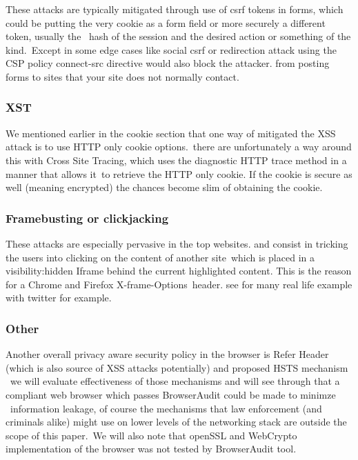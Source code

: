 \documentclass[a4paper,12pt]{paper}
\begin{document}
These attacks are typically mitigated through use of csrf tokens in forms, which could be putting the very cookie as a form field or more securely a different token, usually the \
hash of the session and the desired action or something of the kind.\ Except in some edge cases like social csrf or redirection attack using the CSP policy connect-src directive would also block the attacker.
from posting forms to sites that your site does not normally contact.\\

\subsubsection{XST}
\label{label:xst}

We mentioned earlier in the cookie section that one way of mitigated the XSS attack is to use HTTP only cookie options.\
there are unfortunately a way around this with Cross Site Tracing, which uses the diagnostic HTTP trace method in a manner that allows it\
to retrieve the HTTP only cookie. If the cookie is secure as well (meaning encrypted) the chances become slim of obtaining the cookie.\


\subsubsection{Framebusting or clickjacking}

These attacks are especially pervasive in the top websites. and consist in tricking the users into clicking on the content of another site\
which is placed in a visibility:hidden Iframe behind the current highlighted content. This is the reason for a Chrome and Firefox X-frame-Options\
header. see \cite{buster} for many real life example with twitter for example.

\subsubsection{Other}

Another overall privacy aware security policy in the browser is Refer Header (which is also source of XSS attacks potentially) and proposed HSTS mechanism \
we will evaluate effectiveness of those mechanisms and will see through that a compliant web browser which passes BrowserAudit could be made to minimze \
information leakage, of course the mechanisms that law enforcement (and criminals alike) might use on lower levels of the networking stack are outside the scope of this paper.\
We will also note that openSSL and WebCrypto implementation of the browser was not tested by BrowserAudit tool.\
\end{document}
